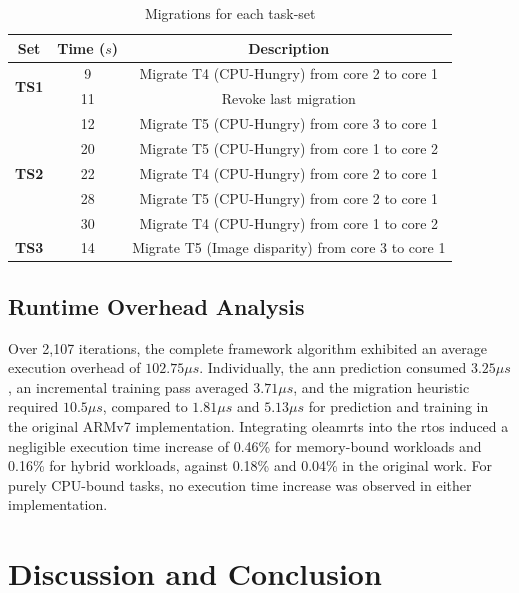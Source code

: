 \documentclass[journal]{IEEEtran}
\begin{document}
\begin{table}[htb]
    \caption{Migrations for each task-set}
    \label{tab:evaluation_migration}
    \centering
    \begin{tabular}{|c|c|c|}
        \hline
        \textbf{Set} & \textbf{Time ($s$)} & \textbf{Description} \\ \hline
        \multirow{2}{*}{\textbf{TS1}}
                             & 9  & Migrate T4 (CPU-Hungry) from core 2 to core 1 \\
                             & 11 & Revoke last migration \\ \hline
        \multirow{5}{*}{\textbf{TS2}}
                             & 12 & Migrate T5 (CPU-Hungry) from core 3 to core 1 \\
                             & 20 & Migrate T5 (CPU-Hungry) from core 1 to core 2 \\
                             & 22 & Migrate T4 (CPU-Hungry) from core 2 to core 1 \\
                             & 28 & Migrate T5 (CPU-Hungry) from core 2 to core 1 \\
                             & 30 & Migrate T4 (CPU-Hungry) from core 1 to core 2 \\ \hline
        \multirow{1}{*}{\textbf{TS3}}
                             & 14 & Migrate T5 (Image disparity) from core 3 to core 1 \\ \hline
    \end{tabular}
\end{table}

\subsection{Runtime Overhead Analysis}

Over 2,107 iterations, the complete framework algorithm exhibited an average execution overhead of $102.75 \mu s$. Individually, the \gls{ann} prediction consumed $3.25 \mu s$, an incremental training pass averaged $3.71 \mu s$, and the migration heuristic required $10.5 \mu s$, compared to $1.81 \mu s$ and $5.13 \mu s$ for prediction and training in the original ARMv7 implementation. Integrating \gls{oleamrts} into the \gls{rtos} induced a negligible execution time increase of 0.46\% for memory-bound workloads and 0.16\% for hybrid workloads, against 0.18\% and 0.04\% in the original work. For purely CPU-bound tasks, no execution time increase was observed in either implementation.

\section{Discussion and Conclusion}
\end{document}
